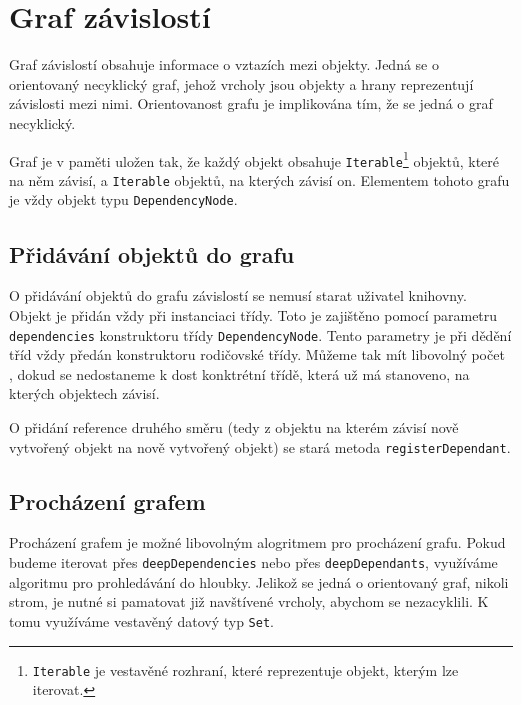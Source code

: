 \chapter{Graf závislostí}
\label{chap:dependency-graph}

Graf závislostí obsahuje informace o vztazích mezi  objekty.
Jedná se o orientovaný necyklický graf\cite{wikipedia:directed-graph}, jehož vrcholy jsou objekty a hrany reprezentují závislosti mezi nimi.
Orientovanost grafu je implikována tím, že se jedná o graf necyklický.

Graf je v paměti uložen tak, že každý objekt obsahuje \texttt{Iterable}\footnote{\texttt{Iterable} je vestavěné rozhraní, které reprezentuje objekt, kterým lze iterovat.} objektů, které na něm závisí, a \texttt{Iterable} objektů, na kterých závisí on\cite[line 17, 21]{geometryjs:source:interfaces:dependencyNode.ts}.
Elementem tohoto grafu je vždy objekt typu \texttt{DependencyNode}.

\section[Přidávání objektů]{Přidávání objektů do grafu}
\label{sec:adding-objects-to-graph}

O přidávání objektů do grafu závislostí se nemusí starat uživatel knihovny.
Objekt je přidán vždy při instanciaci třídy.
Toto je zajištěno pomocí parametru \texttt{dependencies} konstruktoru třídy \texttt{DependencyNode}\cite[line 13-17]{geometryjs:source:geometryObjects:dependencyNode.ts}.
Tento parametry je při dědění tříd vždy předán konstruktoru rodičovské třídy. 
Můžeme tak mít libovolný počet , dokud se nedostaneme k dost konktrétní třídě, která už má stanoveno, na kterých objektech závisí.

O přidání reference druhého směru (tedy z objektu na kterém závisí nově vytvořený objekt na nově vytvořený objekt) se stará metoda \texttt{registerDependant}\cite[line 32]{geometryjs:source:interfaces:dependencyNode.ts}.

\section[Procházení]{Procházení grafem}
\label{sec:traversing-the-graph}

Procházení grafem je možné libovolným alogritmem pro procházení grafu.
Pokud budeme iterovat přes \texttt{deepDependencies}\cite[line 17]{geometryjs:source:interfaces:dependencyNode.ts} nebo přes \texttt{deepDependants}\cite[line 21]{geometryjs:source:interfaces:dependencyNode.ts}, využíváme algoritmu pro prohledávání do hloubky\cite{wikipedia:depth-first-search}.
Jelikož se jedná o orientovaný graf, nikoli strom, je nutné si pamatovat již navštívené vrcholy, abychom se nezacyklili.
K tomu využíváme vestavěný datový typ \texttt{Set}.